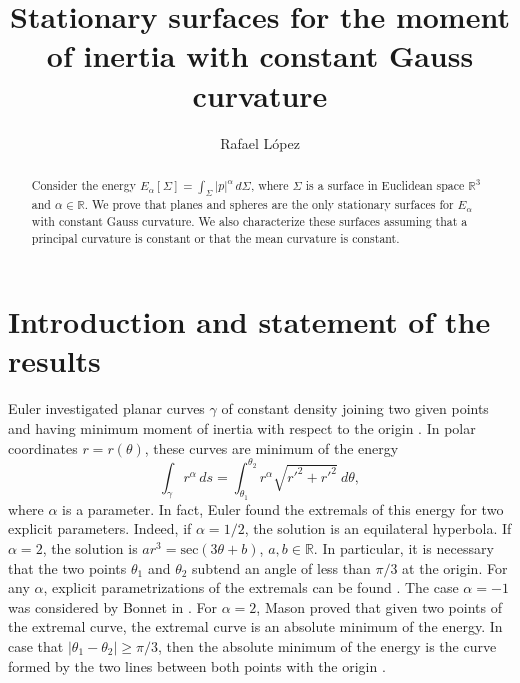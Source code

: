 \documentclass[a4paper,12pt]{amsart}
\theoremstyle{definition}
\def\r{\mathbb R}
\begin{document}
\title[Stationary surfaces for   the moment of  inertia with constant Gauss curvature]{Stationary surfaces for   the moment of  inertia with constant Gauss curvature}
\author{Rafael L\'opez}
\address{ Departamento de Geometr\'{\i}a y Topolog\'{\i}a\\ Universidad de Granada. 18071 Granada, Spain}
  
 


\begin{abstract}  Consider the energy $E_\alpha[\Sigma]=\int_\Sigma |p|^\alpha\, d\Sigma$, where $\Sigma$ is a surface in Euclidean space $\r^3$ and $\alpha\in\r$. We prove that planes and spheres are the only stationary surfaces for $E_\alpha$ with constant Gauss curvature. We also characterize these surfaces assuming that a principal curvature is constant or that the mean curvature is constant.\end{abstract}

\maketitle
\section{Introduction and statement of the results}



Euler investigated planar curves $\gamma$ of constant density joining two given points and having minimum moment of inertia with respect to the origin    \cite[p. 53]{eu}. In polar coordinates $r=r(\theta)$, these curves are minimum of the energy 
$$\int_\gamma r^\alpha\, ds=\int_{\theta_1}^{\theta_2} r^\alpha\sqrt{r'^2+r'^2}\ d\theta,$$
 where $\alpha$ is a parameter. In fact, Euler found the extremals of this energy for two explicit parameters. Indeed, if $\alpha=1/2$, the solution is an equilateral hyperbola. If $\alpha=2$, the solution is  $ar^3=\mbox{sec}(3\theta+b)$, $a,b\in\r$. In particular, it is necessary that the two points $\theta_1$ and $\theta_2$ subtend an angle of less than $\pi/3$ at the origin. For any $\alpha$, explicit parametrizations of the extremals can be found \cite{ca,to}.  The case $\alpha=-1$ was considered by Bonnet in \cite{bo}. For   $\alpha=2$, Mason proved that given two points of the extremal curve,   the extremal curve is an absolute minimum of the energy. In case that $|\theta_1-\theta_2|\geq \pi/3$, then the absolute minimum of the energy is the curve formed by the two lines between both points with the origin \cite{ma}. 
\end{document}
